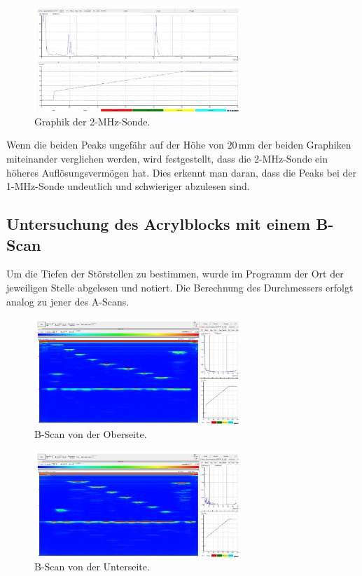 \begin{figure}
    \centering
    \includegraphics[height = 4cm]{2Mhz.pdf}
    \caption{Graphik der 2-MHz-Sonde.}
    \label{fig:2son}
\end{figure}

Wenn die beiden Peaks ungefähr auf der Höhe von $20\,\unit{\mm}$ der beiden Graphiken miteinander verglichen werden, wird festgestellt, dass die 2-MHz-Sonde 
ein höheres Auflösungsvermögen hat. Dies erkennt man daran, dass die Peaks bei der 1-MHz-Sonde undeutlich und schwieriger abzulesen sind.

\subsection{Untersuchung des Acrylblocks mit einem B-Scan}
\label{Sec:AuswertungBScan}
Um die Tiefen der Störstellen zu bestimmen, wurde im Programm der Ort der jeweiligen Stelle abgelesen und notiert. Die Berechnung
des Durchmessers erfolgt analog zu jener des A-Scans. 
\begin{figure}
    \centering
    \includegraphics[height = 4cm]{bscan oben.pdf}
    \caption{B-Scan von der Oberseite.}
    \label{fig:boben}
\end{figure}
\begin{figure}
    \centering
    \includegraphics[height = 4cm]{bscan unten.pdf}
    \caption{B-Scan von der Unterseite.}
    \label{fig:bunten}
\end{figure}

